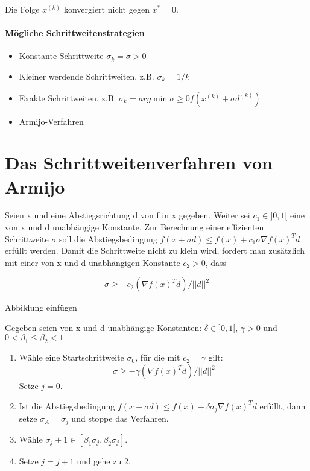 Die Folge $x^{(k)}$ konvergiert nicht gegen $x^{*} = 0$.


\paragraph{Mögliche Schrittweitenstrategien}

\begin{itemize}
	\item Konstante Schrittweite $\sigma_k = \sigma > 0$
	\item Kleiner werdende Schrittweiten, z.B. $\sigma_k = 1/k$
	\item Exakte Schrittweiten, z.B. $\sigma_k = arg \min {\sigma \geq 0} f(x^{(k)} + \sigma d^{(k)})$
	\item  Armijo-Verfahren
\end{itemize}

\section{Das Schrittweitenverfahren von Armijo}

Seien x und eine Abstiegsrichtung d von f in x gegeben. Weiter sei
$c_1 \in ]0, 1[$ eine von x und d unabhängige Konstante. Zur Berechnung
einer effizienten Schrittweite $\sigma$ soll die Abstiegsbedingung
$f(x + \sigma d) \leq f(x) + c_1 \sigma \nabla f(x)^Td$
erfüllt werden. Damit die Schrittweite nicht zu klein wird, fordert man
zusätzlich mit einer von x und d unabhängigen Konstante $c_2 > 0$, dass

\begin{equation}
\sigma \geq -c_2 (\nabla f(x)^Td) / ||d||^2 
\end{equation}

Abbildung einfügen


Gegeben seien von x und d unabhängige Konstanten:
$\delta \in ]0, 1[$, $\gamma > 0$ und $0 < \beta_1 \leq \beta_2 < 1$

\begin{enumerate}
	\item  Wähle eine Startschrittweite $\sigma_0$, für die mit $c_2 = \gamma$ gilt:
	\begin{equation}
	\sigma \geq - \gamma (\nabla f(x)^Td)/||d||^2
	\end{equation}
	Setze $j = 0$.
	\item Ist die Abstiegsbedingung
	 $f(x + \sigma d) \leq f(x) + \delta \sigma_j \nabla f(x)^Td$
	 erfüllt, dann setze $\sigma_A = \sigma_j$ und stoppe das Verfahren.
	\item Wähle $\sigma_j+ 1 \in [\beta_1 \sigma_j , \beta_2 \sigma_j ]$.
	\item Setze $j = j + 1$ und gehe zu 2.
\end{enumerate}


